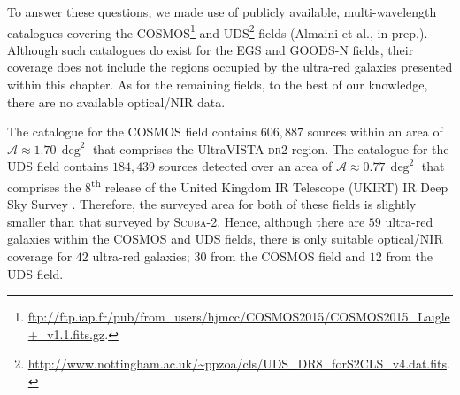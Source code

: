 \documentclass[a4paper, fleqn, usenatbib]{mnras}
\newcommand{\scuba}{\mbox{\textsc{Scuba}-2}}
\newcommand{\urgs}{ultra-red galaxies}
\begin{document}
To answer these questions, we made use of publicly available, multi-wavelength catalogues covering the COSMOS\footnote{%
    \url{ftp://ftp.iap.fr/pub/from_users/hjmcc/COSMOS2015/COSMOS2015_Laigle+_v1.1.fits.gz}.}
 \citep{mccracken12, laigle16} and UDS\footnote{%
    \url{http://www.nottingham.ac.uk/~ppzoa/cls/UDS_DR8_forS2CLS_v4.dat.fits}.}
fields (Almaini et al., in prep.).
Although such catalogues do exist for the EGS and GOODS-N fields, their coverage does not include the regions occupied by the \urgs{} presented within this chapter.
As for the remaining fields, to the best of our knowledge, there are no available optical/NIR data.

The catalogue for the COSMOS field contains $606{,}887$ sources within an area of $\mathcal{A}\approx1.70\,\deg^2$ that comprises the UltraVISTA-\textsc{dr}2 region.
The catalogue for the UDS field contains $184{,}439$ sources detected over an area of $\mathcal{A}\approx0.77\,\deg^2$ that comprises the 8\textsuperscript{th} release \citep{hartley13} of the United Kingdom IR Telescope (UKIRT) IR Deep Sky Survey \citep[UKIDSS ---][]{lawrence07}.
Therefore, the surveyed area for both of these fields is slightly smaller than that surveyed by \scuba{}.
Hence, although there are $59$ \urgs{} within the COSMOS and UDS fields, there is only suitable optical/NIR coverage for $42$ \urgs{}; $30$ from the COSMOS field and $12$ from the UDS field.
\end{document}
